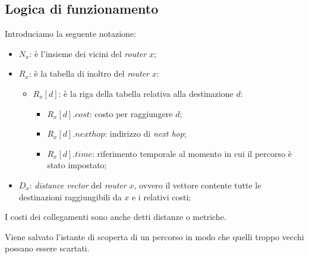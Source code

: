 \subsection{Logica di funzionamento}
Introduciamo la seguente notazione:
\begin{itemize}
    \item $N_x$: è l'insieme dei vicini del \emph{router} $x$;
    \item $R_x$: è la tabella di inoltro del \emph{router} $x$:
    \begin{itemize}
        \item $R_x[d]$: è la riga della tabella relativa alla destinazione $d$:
        \begin{itemize}
            \item $R_x[d].cost$: costo per raggiungere $d$;
            \item $R_x[d].nexthop$: indirizzo di \emph{next hop};
            \item $R_x[d].time$: riferimento temporale al momento in cui il percorso
            è stato impostato;
        \end{itemize}
    \end{itemize}
    \item $D_x$: \emph{distance vector} del \emph{router} $x$, ovvero il vettore
    contente tutte le destinazioni raggiungibili da $x$ e i relativi costi;
\end{itemize}
\begin{note}
    I costi dei collegamenti sono anche detti distanze o metriche.
\end{note}
\begin{note}
    Viene salvato l'istante di scoperta di un percorso in modo che quelli troppo
    vecchi possano essere scartati.
\end{note}

